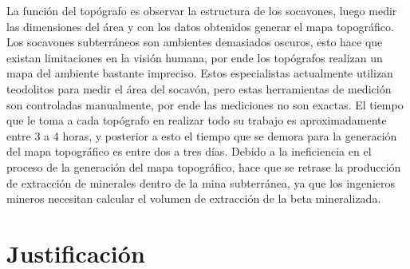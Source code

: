 La función del topógrafo es observar la estructura de los socavones, luego medir 
las dimensiones del área y con los datos obtenidos generar el mapa topográfico. Los 
socavones subterráneos son ambientes demasiados oscuros, esto hace que existan 
limitaciones en la visión humana, por ende los topógrafos realizan un mapa del 
ambiente bastante impreciso. Estos especialistas actualmente utilizan teodolitos 
para medir el área del socavón, pero estas herramientas de medición son 
controladas manualmente, por ende las mediciones no son exactas. El tiempo 
que le toma a cada topógrafo en realizar todo su trabajo es aproximadamente entre 
3 a 4 horas, y posterior a esto el tiempo que se demora para la generación del mapa 
topográfico es entre dos a tres días. Debido a la ineficiencia en el proceso de la 
generación del mapa topográfico, hace que se retrase la producción de extracción 
de minerales dentro de la mina subterránea, ya que los ingenieros mineros 
necesitan calcular el volumen de extracción de la beta mineralizada.



\section{Justificación}




